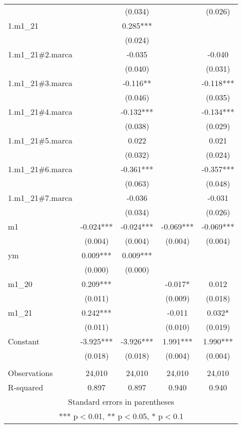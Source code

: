 \begin{longtable}{lcccc}
 &  & (0.034) &  & (0.026) \\
1.m1\_21 &  & 0.285*** &  &  \\
 &  & (0.024) &  &  \\
1.m1\_21\#2.marca &  & -0.035 &  & -0.040 \\
 &  & (0.040) &  & (0.031) \\
1.m1\_21\#3.marca &  & -0.116** &  & -0.118*** \\
 &  & (0.046) &  & (0.035) \\
1.m1\_21\#4.marca &  & -0.132*** &  & -0.134*** \\
 &  & (0.038) &  & (0.029) \\
1.m1\_21\#5.marca &  & 0.022 &  & 0.021 \\
 &  & (0.032) &  & (0.024) \\
1.m1\_21\#6.marca &  & -0.361*** &  & -0.357*** \\
 &  & (0.063) &  & (0.048) \\
1.m1\_21\#7.marca &  & -0.036 &  & -0.031 \\
 &  & (0.034) &  & (0.026) \\
m1 & -0.024*** & -0.024*** & -0.069*** & -0.069*** \\
 & (0.004) & (0.004) & (0.004) & (0.004) \\
ym & 0.009*** & 0.009*** &  &  \\
 & (0.000) & (0.000) &  &  \\
m1\_20 & 0.209*** &  & -0.017* & 0.012 \\
 & (0.011) &  & (0.009) & (0.018) \\
m1\_21 & 0.242*** &  & -0.011 & 0.032* \\
 & (0.011) &  & (0.010) & (0.019) \\
Constant & -3.925*** & -3.926*** & 1.991*** & 1.990*** \\
 & (0.018) & (0.018) & (0.004) & (0.004) \\
 &  &  &  &  \\
Observations & 24,010 & 24,010 & 24,010 & 24,010 \\
 R-squared & 0.897 & 0.897 & 0.940 & 0.940 \\ \hline
\multicolumn{5}{c}{ Standard errors in parentheses} \\
\multicolumn{5}{c}{ *** p$<$0.01, ** p$<$0.05, * p$<$0.1} \\
\end{longtable}
